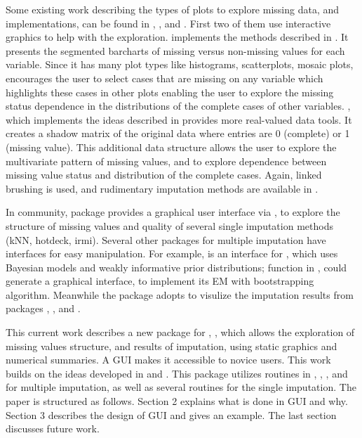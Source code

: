 \documentclass[article]{jss}
\begin{document}
Some existing work describing the types of plots to explore missing data, and implementations, can be found in \citet{unwin1996interactive}, \citet{swayne1998missing}, and \citet{templ2008visualization}. First two of them use interactive graphics to help with the exploration.  implements the methods described in \citet{unwin1996interactive}. It presents the segmented barcharts of missing versus non-missing values for each variable. Since it has many plot types like histograms, scatterplots, mosaic plots,  encourages the user to select cases that are missing on any variable which highlights these cases in other plots enabling the user to explore the missing status dependence in the distributions of the complete cases of other variables.  , which implements the ideas described in \citet{swayne1998missing} provides more real-valued data tools. It creates a shadow matrix of the original data where entries are 0 (complete) or 1 (missing value). This additional data structure allows the user to explore the multivariate pattern of missing values, and to explore dependence between missing value status and distribution of the complete cases. Again, linked brushing is used, and rudimentary imputation methods are available in  \citep{STLBC03}.

In  community, package  \citep{VIM} provides a graphical user interface via  \citep{VIMGUI}, to explore the structure of missing values and quality of several single imputation methods (kNN, hotdeck, irmi). Several other packages for multiple imputation have interfaces for easy manipulation. For example,  \citep{migui} is an interface for  \citep{mi}, which uses Bayesian models and weakly informative prior distributions; function  in  \citep{amelia}, could generate a graphical interface, to implement its EM with bootstrapping algorithm. Meanwhile the package  \citep{mip} adopts  to visulize the imputation results from packages  \citep{mice}, , and .

This current work describes a new package for , , which allows the exploration of missing values structure, and results of imputation, using static graphics and numerical summaries. A GUI makes it accessible to novice users. This work builds on the ideas developed in \citet{unwin1996interactive} and \citet{swayne1998missing}. This package utilizes routines in ,  \citep{norm}, , and  for multiple imputation, as well as several routines for the single imputation. The paper is structured as follows. Section 2 explains what is done in GUI and why. Section 3 describes the design of GUI and gives an example. The last section discusses future work.
\end{document}
